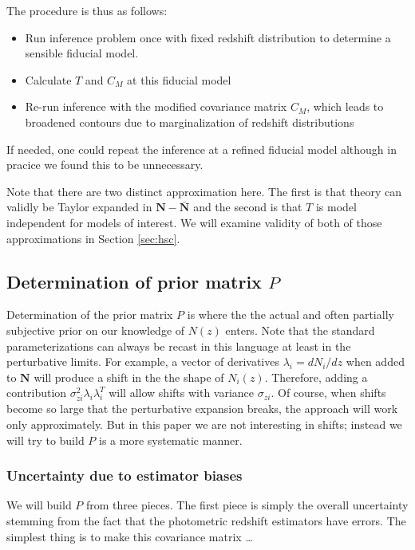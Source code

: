 \documentclass[a4paper,11pt]{article}
\newcommand{\vN}{\mathbf{N}}
\begin{document}
  The procedure is thus as follows:
  \begin{itemize}
  \item Run inference problem once with fixed redshift distribution to determine a sensible fiducial model.
    
  \item Calculate $T$ and $C_M$ at this fiducial model
    
  \item Re-run inference with the modified covariance matrix $C_M$, which leads to broadened contours due to marginalization of redshift distributions
    
  \end{itemize}
If needed, one could repeat the inference at a refined fiducial model although in pracice we found this to be unnecessary.

Note that there are two distinct approximation here. The first is that theory can validly be Taylor expanded in $\vN-\bar{\vN}$ and the second is that $T$ is model independent for models of interest. We will examine validity of both of those approximations in Section \ref{sec:hsc}.

\subsection{Determination of prior matrix $P$}

Determination of the prior matrix $P$ is where the the actual and often partially subjective prior on our knowledge of $N(z)$ enters. Note that the standard parameterizations can always be recast in this language at least in the perturbative limits. For example, a vector of derivatives $\lambda_i = dN_i/dz$ when added to $\vN$ will produce a shift in the the shape of $N_i(z)$. Therefore, adding a contribution $\sigma_{zi}^2 \lambda_i \lambda_i^T$ will allow shifts with variance $\sigma_{zi}$. Of course, when shifts become so large that the perturbative expansion breaks, the approach will work only approximately. But in this paper we are not interesting in shifts; instead we will try to build $P$ is a more systematic manner. 


\subsubsection{Uncertainty due to estimator biases}
We will build $P$ from three pieces. The first piece is simply the overall uncertainty stemming from the fact that the photometric redshift estimators have errors. The simplest thing is to make this covariance matrix   \ldots
\end{document}
